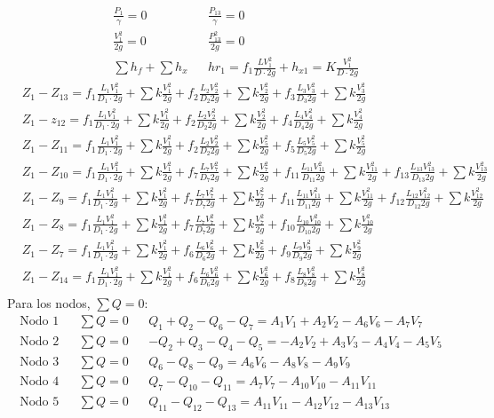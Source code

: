 \begin{align*}
    &\frac{P_1}{\gamma} = 0&& \frac{P_{13}}{\gamma} = 0\\
    &\frac{V_1^2}{2g} = 0&& \frac{P_{13}^2}{2g} = 0\\
    &\sum h_f + \sum h_x&& hr_1 = f_1\frac{LV_1^2}{D\cdot 2g} + h_{x1} = K\frac{V_1^2}{D\cdot 2g}
\end{align*}
\begin{align*}
    &Z_1 - Z_{13} = f_1\frac{L_1V_1^2}{D_1\cdot 2g} + \sum k\frac{V_1^2}{2g} + f_2\frac{L_2V_2^2}{D_2 2g} + \sum k\frac{V_2^2}{2g} + f_3\frac{L_3V_3^2}{D_3 2g} + \sum k\frac{V_3^2}{2g}\\
    &Z_1 - z_{12} = f_1\frac{L_1V_1^2}{D_1\cdot 2g} + \sum k\frac{V_1^2}{2g} + f_2\frac{L_2V_2^2}{D_2 2g} + \sum k\frac{V_2^2}{2g} + f_4\frac{L_4V_4^2}{D_4 2g} + \sum k\frac{V_4^2}{2g}\\
    &Z_1 - Z_{11} = f_1\frac{L_1V_1^2}{D_1\cdot 2g} + \sum k\frac{V_1^2}{2g} + f_2\frac{L_2V_2^2}{D_2 2g} + \sum k\frac{V_5^2}{2g} + f_5\frac{L_5V_5^2}{D_5 2g} + \sum k\frac{V_5^2}{2g}\\
    &Z_1 - Z_{10} = f_1\frac{L_1V_1^2}{D_1\cdot 2g} + \sum k\frac{V_1^2}{2g} + f_7\frac{L_7V_7^2}{D_7 2g} + \sum k\frac{V_7^2}{2g} + f_{11}\frac{L_{11}V_{11}^2}{D_{11} 2g} + \sum k\frac{V_{11}^2}{2g} + f_{13}\frac{L_{13}V_{13}^2}{D_{13} 2g} + \sum k\frac{V_{13}^2}{2g}\\
    &Z_1 - Z_{9} = f_1\frac{L_1V_1^2}{D_1\cdot 2g} + \sum k\frac{V_1^2}{2g} + f_7\frac{L_7V_7^2}{D_7 2g} + \sum k\frac{V_7^2}{2g} + f_{11}\frac{L_{11}V_{11}^2}{D_{11} 2g} + \sum k\frac{V_{11}^2}{2g} + f_{12}\frac{L_{12}V_{12}^2}{D_{12} 2g} + \sum k\frac{V_{12}^2}{2g}\\
    &Z_1 - Z_{8} = f_1\frac{L_1V_1^2}{D_1\cdot 2g} + \sum k\frac{V_1^2}{2g} + f_7\frac{L_7V_7^2}{D_7 2g} + \sum k\frac{V_7^2}{2g} + f_{10}\frac{L_{10}V_{10}^2}{D_{10} 2g} + \sum k\frac{V_{10}^2}{2g} \\
    &Z_1 - Z_{7} = f_1\frac{L_1V_1^2}{D_1\cdot 2g} + \sum k\frac{V_1^2}{2g} + f_6\frac{L_6V_6^2}{D_6 2g} + \sum k\frac{V_6^2}{2g} + f_{9}\frac{L_{9}V_{9}^2}{D_{9} 2g} + \sum k\frac{V_{9}^2}{2g} \\
    &Z_1 - Z_{14} = f_1\frac{L_1V_1^2}{D_1\cdot 2g} + \sum k\frac{V_1^2}{2g} + f_6\frac{L_6V_6^2}{D_6 2g} + \sum k\frac{V_6^2}{2g} + f_{8}\frac{L_{8}V_{8}^2}{D_{8} 2g} + \sum k\frac{V_{8}^2}{2g} \\
\end{align*}
Para los nodos, $\sum Q=0$:
\begin{align*}
    \text{Nodo 1} &&\sum Q =0&& Q_1+Q_2 - Q_6 - Q_7 = A_1V_1+ A_2V_2 - A_6V_6 - A_7V_7\\
    \text{Nodo 2} &&\sum Q =0&& - Q_2 + Q_3 - Q_4 - Q_5 = - A_2V_2 + A_3V_3 - A_4V_4 - A_5V_5\\
    \text{Nodo 3} &&\sum Q =0&& Q_6 - Q_8 - Q_9 = A_6V_6 - A_8V_8 - A_9V_9\\
    \text{Nodo 4} &&\sum Q =0&& Q_7 - Q_10 - Q_11 = A_7V_7 - A_10V_10 - A_11V_11\\
    \text{Nodo 5} &&\sum Q =0&& Q_{11} - Q_{12} - Q_{13} = A_{11}V_{11} - A_{12}V_{12} - A_{13}V_{13}\\
\end{align*}
